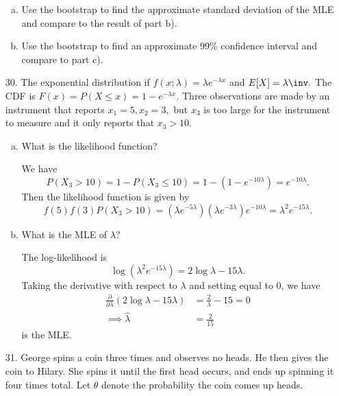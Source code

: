 \documentclass{article}
\begin{document}
\begin{itemize}
\begin{enumerate}[a.]
			\item Use the bootstrap to find the approximate standard deviation of the MLE and compare to the result of part b).

			\item Use the bootstrap to find an approximate 99\% confidence interval and compare to part c).
				
		\end{enumerate}

	\item[30.] The exponential distribution if $f(x;\lambda)=\lambda e^{-\lambda x}$ and $E[X]=\lambda\inv.$ The CDF is $F(x)=P(X\le x)=1-e^{-\lambda x}.$ Three observations are made by an instrument that reports $x_1=5, x_2=3,$ but $x_3$ is too large for the instrument to measure and it only reports that $x_3>10.$

		\begin{enumerate}[a.]
			\item What is the likelihood function?
				\begin{soln}
					We have \[P(X_3>10)=1-P(X_3\le 10)=1-(1-e^{-10\lambda})=e^{-10\lambda}.\] Then the likelihood function is given by \[f(5)f(3)P(X_3>10)=(\lambda e^{-5\lambda})(\lambda e^{-3\lambda})e^{-10\lambda}=\lambda^2 e^{-15\lambda}.\]
					
				\end{soln}

			\item What is the MLE of $\lambda?$
				\begin{soln}
					The log-likelihood is \[\log\left( \lambda^2 e^{-15\lambda} \right)=2\log\lambda-15\lambda.\] Taking the derivative with respect to $\lambda$ and setting equal to 0, we have
					\begin{align*}
						\frac{\partial}{\partial\lambda}\left( 2\log \lambda-15\lambda \right) &= \frac{2}{\lambda}-15 = 0 \\
						\implies \hat{\lambda} &= \frac{2}{15}
					\end{align*} is the MLE.
					
				\end{soln}
				
		\end{enumerate}

	\item[31.] George spins a coin three times and observes no heads. He then gives the coin to Hilary. She spins it until the first head occurs, and ends up spinning it four times total. Let $\theta$ denote the probability the coin comes up heads.


\end{itemize}
\end{document}
